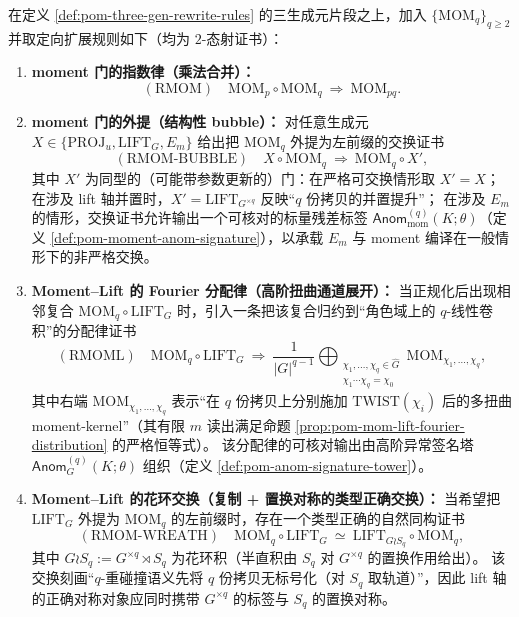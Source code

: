 \begin{definition}\label{def:pom-four-gen-rewrite-rules}
在定义 \ref{def:pom-three-gen-rewrite-rules} 的三生成元片段之上，加入 \(\{\mathrm{MOM}_q\}_{q\ge 2}\) 并取定向扩展规则如下（均为 \(2\)-态射证书）：
\begin{enumerate}
  \item \textbf{moment 门的指数律（乘法合并）：}
  $$
  (\mathrm{RMOM})\quad
  \mathrm{MOM}_p\circ \mathrm{MOM}_q\ \Rightarrow\ \mathrm{MOM}_{pq}.
  $$
  \item \textbf{moment 门的外提（结构性 bubble）：}
  对任意生成元 \(X\in\{\mathrm{PROJ}_u,\mathrm{LIFT}_G,E_m\}\) 给出把 \(\mathrm{MOM}_q\) 外提为左前缀的交换证书
  $$
  (\mathrm{RMOM\text{-}BUBBLE})\quad
  X\circ \mathrm{MOM}_q\ \Rightarrow\ \mathrm{MOM}_q\circ X',
  $$
  其中 \(X'\) 为同型的（可能带参数更新的）门：在严格可交换情形取 \(X'=X\)；
  在涉及 lift 轴并置时，\(X'=\mathrm{LIFT}_{G^{\times q}}\) 反映“\(q\) 份拷贝的并置提升”；
  在涉及 \(E_m\) 的情形，交换证书允许输出一个可核对的标量残差标签
  \(\mathsf{Anom}^{(q)}_{\mathrm{mom}}(K;\theta)\)（定义 \ref{def:pom-moment-anom-signature}），以承载 \(E_m\) 与 moment 编译在一般情形下的非严格交换。
  \item \textbf{Moment--Lift 的 Fourier 分配律（高阶扭曲通道展开）：}
  当正规化后出现相邻复合 \(\mathrm{MOM}_q\circ \mathrm{LIFT}_G\) 时，引入一条把该复合归约到“角色域上的 \(q\)-线性卷积”的分配律证书
  \[
  (\mathrm{RMOML})\quad
  \mathrm{MOM}_q\circ \mathrm{LIFT}_G
  \ \Rightarrow\
  \frac{1}{|G|^{q-1}}
  \bigoplus_{\substack{\chi_1,\dots,\chi_q\in\widehat G\\ \chi_1\cdots\chi_q=\chi_0}}
  \mathrm{MOM}_{\chi_1,\dots,\chi_q},
  \]
  其中右端 \(\mathrm{MOM}_{\chi_1,\dots,\chi_q}\) 表示“在 \(q\) 份拷贝上分别施加 \(\mathrm{TWIST}(\chi_i)\) 后的多扭曲 moment-kernel”（其有限 \(m\) 读出满足命题 \ref{prop:pom-mom-lift-fourier-distribution} 的严格恒等式）。
  该分配律的可核对输出由高阶异常签名塔 \(\mathsf{Anom}^{(q)}_G(K;\theta)\) 组织（定义 \ref{def:pom-anom-signature-tower}）。
  \item \textbf{Moment--Lift 的花环交换（复制 + 置换对称的类型正确交换）：}
  当希望把 \(\mathrm{LIFT}_G\) 外提为 \(\mathrm{MOM}_q\) 的左前缀时，存在一个类型正确的自然同构证书
  \[
  (\mathrm{RMOM\text{-}WREATH})\quad
  \mathrm{MOM}_q\circ \mathrm{LIFT}_G
  \ \simeq\
  \mathrm{LIFT}_{G\wr S_q}\circ \mathrm{MOM}_q,
  \]
  其中
  \(G\wr S_q:=G^{\times q}\rtimes S_q\)
  为花环积（半直积由 \(S_q\) 对 \(G^{\times q}\) 的置换作用给出）。
  该交换刻画“\(q\)-重碰撞语义先将 \(q\) 份拷贝无标号化（对 \(S_q\) 取轨道）”，因此 lift 轴的正确对称对象应同时携带 \(G^{\times q}\) 的标签与 \(S_q\) 的置换对称。
\end{enumerate}
\end{definition}

